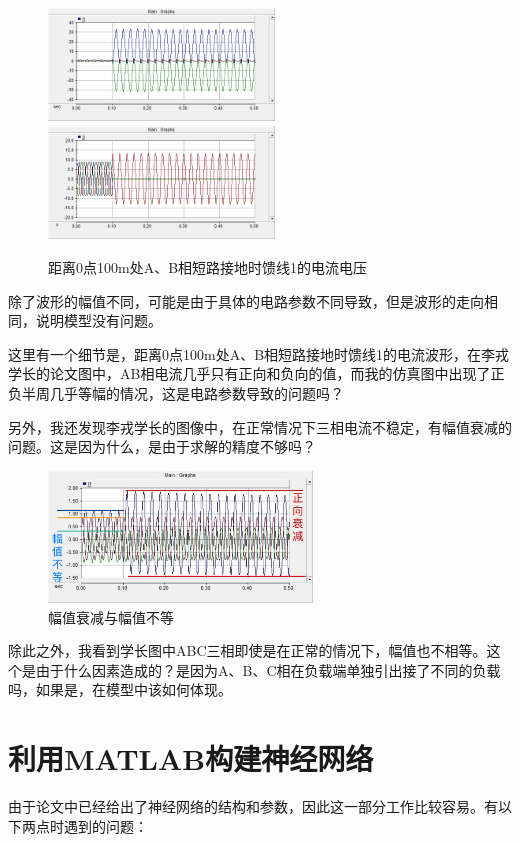 \documentclass{article}
\begin{document}
{\begin{figure}[h]
		\includegraphics[width=6cm]{figure/10.png}
		\includegraphics[width=6cm]{figure/11.png}
		\caption{距离0点100m处A、B相短路接地时馈线1的电流电压}
	\end{figure}

	除了波形的幅值不同，可能是由于具体的电路参数不同导致，但是波形的走向相同，说明模型没有问题。
	
	这里有一个细节是，距离0点100m处A、B相短路接地时馈线1的电流波形，在李戎学长的论文图中，AB相电流几乎只有正向和负向的值，而我的仿真图中出现了正负半周几乎等幅的情况，这是电路参数导致的问题吗？
	
	另外，我还发现李戎学长的图像中，在正常情况下三相电流不稳定，有幅值衰减的问题。这是因为什么，是由于求解的精度不够吗？
	
	\begin{figure}[H]
		\centering
		\includegraphics[width=7cm]{figure/6-1.jpg}
		\caption{幅值衰减与幅值不等}
	\end{figure}
	
	除此之外，我看到学长图中ABC三相即使是在正常的情况下，幅值也不相等。这个是由于什么因素造成的？是因为A、B、C相在负载端单独引出接了不同的负载吗，如果是，在模型中该如何体现。
	
	\section{利用MATLAB构建神经网络}
	
	由于论文中已经给出了神经网络的结构和参数，因此这一部分工作比较容易。有以下两点时遇到的问题：
	
}
\end{document}
